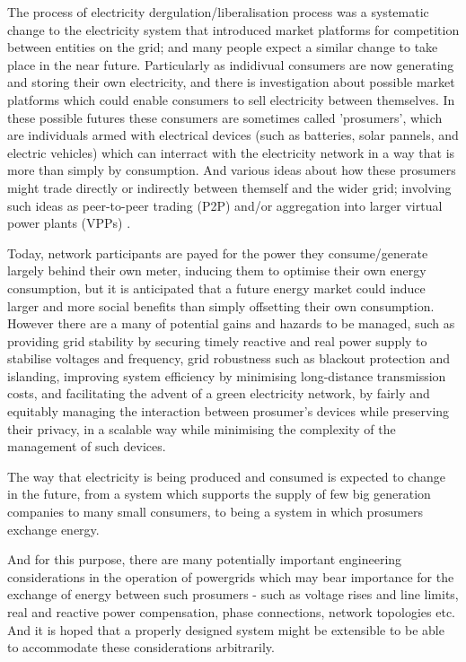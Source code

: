The process of electricity dergulation/liberalisation process was a systematic change to the electricity system that introduced market platforms for competition between entities on the grid; and many people expect a similar change to take place in the near future.
Particularly as indidivual consumers are now generating and storing their own electricity, and there is investigation about possible market platforms which could enable consumers to sell electricity between themselves.
In these possible futures these consumers are sometimes called 'prosumers', which are individuals armed with electrical devices (such as batteries, solar pannels, and electric vehicles) which can interract with the electricity network in a way that is more than simply by consumption.
And various ideas about how these prosumers might trade directly or indirectly between themself and the wider grid; involving such ideas as peer-to-peer trading (P2P) and/or aggregation into larger virtual power plants (VPPs) \cite{Morstyn2018}.

Today, network participants are payed for the power they consume/generate largely behind their own meter, inducing them to optimise their own energy consumption, but it is anticipated that a future energy market could induce larger and more social benefits than simply offsetting their own consumption.
However there are a many of potential gains and hazards to be managed, such as providing grid stability by securing timely reactive and real power supply to stabilise voltages and frequency, grid robustness such as blackout protection and islanding, improving system efficiency by minimising long-distance transmission costs, and facilitating the advent of a green electricity network, by fairly and equitably managing the interaction between prosumer's devices while preserving their privacy, in a scalable way while minimising the complexity of the management of such devices. \cite{BELL2018765}

The way that electricity is being produced and consumed is expected to change in the future, from a system which supports the supply of few big generation companies to many small consumers, to being a system in which prosumers exchange energy.

And for this purpose, there are many potentially important engineering considerations in the operation of powergrids which may bear importance for the exchange of energy between such prosumers - such as voltage rises and line limits, real and reactive power compensation, phase connections, network topologies etc.
And it is hoped that a properly designed system might be extensible to be able to accommodate these considerations arbitrarily.

